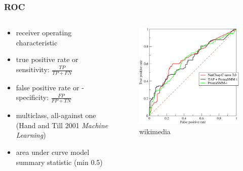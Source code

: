 \documentclass{beamer}\usepackage{graphicx, color}
\begin{document}
\begin{frame}
  \frametitle{ROC}
  \begin{columns}
    \begin{column}{0.4\textwidth}
      \begin{itemize}
        \item receiver operating characteristic
        \item true positive rate or sensitivity: \(\frac{TP}{TP + FN}\)
        \item false positive rate or  - specificity: \(\frac{FP}{FP + TN}\)
        \item multiclass, all-against one (Hand and Till 2001 \textit{Machine Learning})
        \item area under curve model summary statistic (min 0.5)
      \end{itemize}
    \end{column}
    \begin{column}{0.6\textwidth}
      \begin{figure}[h]
        \centering
        \captionsetup{justification = raggedleft, slc = off}
        \includegraphics[width = \textwidth, keepaspectratio = true]{figure/wiki_roc}
        \caption*{\scriptsize{wikimedia}}
        \label{fig:roc}
      \end{figure}
    \end{column}
  \end{columns}

\end{frame}
\end{document}
